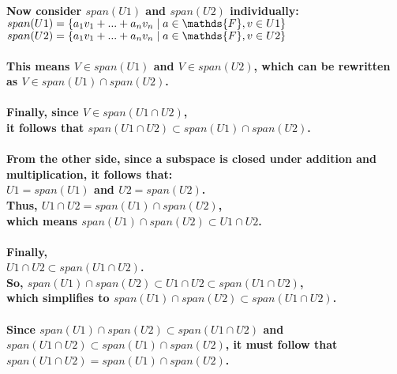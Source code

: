 \documentclass{article}
\begin{document}
\paragraph{\large
Now consider $span(U1)$ and $span(U2)$ individually:
\\\indent $span(U1) = \{a_{1}v_{1} + ... + a_{n}v_{n} \thickspace | \thickspace a \in \mathds{F}, v \in U1\}$
\\\indent $span(U2) = \{a_{1}v_{1} + ... + a_{n}v_{n} \thickspace | \thickspace a \in \mathds{F}, v \in U2\}$}

\paragraph{\large
This means $V \in span(U1)$ and $V \in span(U2)$, which can be rewritten as $V \in span(U1) \cap span(U2)$. 
\\\\Finally, since $V \in span(U1 \cap U2)$, 
\\\indent it follows that $span(U1 \cap U2) \subset span(U1) \cap span(U2)$.}

\paragraph{\large
From the other side, since a subspace is closed under addition 
and multiplication, it follows that:
\\\indent $U1 = span(U1)$ and $U2 = span(U2)$.
\\\indent Thus, $U1 \cap U2 = span(U1) \cap span(U2)$,
\\\indent which means $span(U1) \cap span(U2) \subset U1 \cap U2$.}

\paragraph{\large
Finally,
\\\indent $U1 \cap U2 \subset span(U1 \cap U2)$.
\\\indent So, $span(U1) \cap span(U2) \subset U1 \cap U2 \subset span(U1 \cap U2)$,
\\\indent which simplifies to $span(U1) \cap span(U2) \subset span(U1 \cap U2)$.}

\paragraph{\large
Since $span(U1) \cap span(U2) \subset span(U1 \cap U2)$ and
\\ $span(U1 \cap U2) \subset span(U1) \cap span(U2)$, it must follow that
\\ $span(U1 \cap U2) = span(U1) \cap span(U2)$.}
\end{document}
